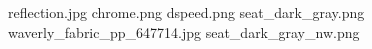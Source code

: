 reflection.jpg
chrome.png
dspeed.png
seat_dark_gray.png
waverly_fabric_pp_647714.jpg
seat_dark_gray_nw.png
